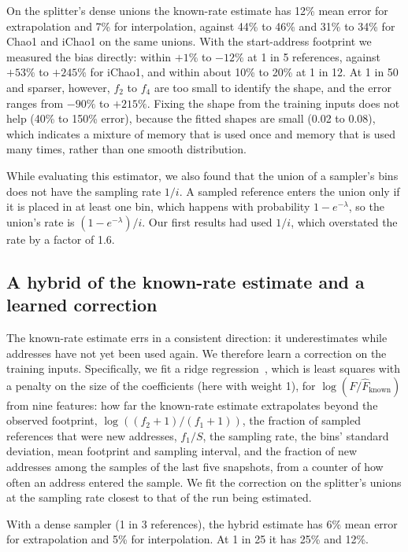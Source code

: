 \documentclass[11pt]{article}
\begin{document}
On the splitter's dense unions the known-rate estimate has 12\% mean error for extrapolation and 7\% for interpolation, against 44\% to 46\% and 31\% to 34\% for Chao1 and iChao1 on the same unions. With the start-address footprint we measured the bias directly: within $+1\%$ to $-12\%$ at 1 in 5 references, against $+53\%$ to $+245\%$ for iChao1, and within about 10\% to 20\% at 1 in 12. At 1 in 50 and sparser, however, $f_2$ to $f_4$ are too small to identify the shape, and the error ranges from $-90\%$ to $+215\%$. Fixing the shape from the training inputs does not help (40\% to 150\% error), because the fitted shapes are small (0.02 to 0.08), which indicates a mixture of memory that is used once and memory that is used many times, rather than one smooth distribution.

While evaluating this estimator, we also found that the union of a sampler's bins does not have the sampling rate $1/i$. A sampled reference enters the union only if it is placed in at least one bin, which happens with probability $1 - e^{-\lambda}$, so the union's rate is $(1 - e^{-\lambda})/i$. Our first results had used $1/i$, which overstated the rate by a factor of 1.6.

\subsection{A hybrid of the known-rate estimate and a learned correction}

The known-rate estimate errs in a consistent direction: it underestimates while addresses have not yet been used again. We therefore learn a correction on the training inputs. Specifically, we fit a ridge regression~\cite{hoerl1970ridge}, which is least squares with a penalty on the size of the coefficients (here with weight 1), for $\log(F/\hat{F}_{\text{known}})$ from nine features: how far the known-rate estimate extrapolates beyond the observed footprint, $\log((f_2 + 1)/(f_1 + 1))$, the fraction of sampled references that were new addresses, $f_1/S$, the sampling rate, the bins' standard deviation, mean footprint and sampling interval, and the fraction of new addresses among the samples of the last five snapshots, from a counter of how often an address entered the sample. We fit the correction on the splitter's unions at the sampling rate closest to that of the run being estimated.

With a dense sampler (1 in 3 references), the hybrid estimate has 6\% mean error for extrapolation and 5\% for interpolation. At 1 in 25 it has 25\% and 12\%.
\end{document}

